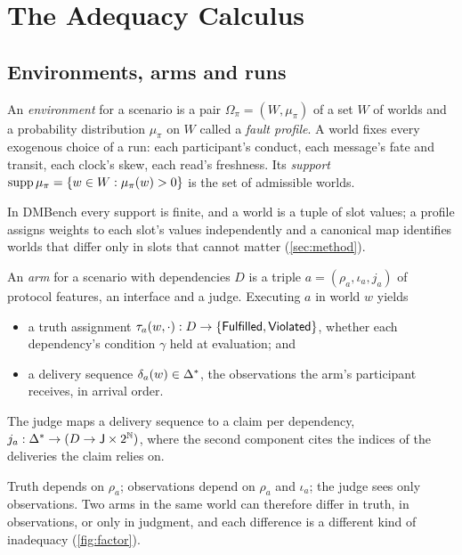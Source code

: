 \section{The Adequacy Calculus}
\label{sec:calculus}

\subsection{Environments, arms and runs}

\begin{definition}[Environment]
\label{def:environment}
An \emph{environment} for a scenario is a pair $\Omega_\pi = (W, \mu_\pi)$ of a set $W$ of worlds and a probability distribution $\mu_\pi$ on $W$ called a \emph{fault profile}. A world fixes every exogenous choice of a run: each participant's conduct, each message's fate and transit, each clock's skew, each read's freshness. Its \emph{support} $\operatorname{supp}\mu_\pi = \{ w \in W : \mu_\pi(w) > 0 \}$ is the set of admissible worlds.
\end{definition}

In DMBench every support is finite, and a world is a tuple of slot values; a profile assigns weights to each slot's values independently and a canonical map identifies worlds that differ only in slots that cannot matter (\cref{sec:method}).

\begin{definition}[Arm]
\label{def:arm}
An \emph{arm} for a scenario with dependencies $D$ is a triple $a = (\rho_a, \iota_a, j_a)$ of protocol features, an interface and a judge. Executing $a$ in world $w$ yields
\begin{itemize}
\item a truth assignment $\tau_a(w, \cdot) : D \to \{\mathsf{Fulfilled}, \mathsf{Violated}\}$, whether each dependency's condition $\gamma$ held at evaluation; and
\item a delivery sequence $\delta_a(w) \in \Delta^*$, the observations the arm's participant receives, in arrival order.
\end{itemize}
The judge maps a delivery sequence to a claim per dependency, $j_a : \Delta^* \to (D \to \mathsf{J} \times 2^{\mathbb{N}})$, where the second component cites the indices of the deliveries the claim relies on.
\end{definition}

Truth depends on $\rho_a$; observations depend on $\rho_a$ and $\iota_a$; the judge sees only observations. Two arms in the same world can therefore differ in truth, in observations, or only in judgment, and each difference is a different kind of inadequacy (\cref{fig:factor}).

